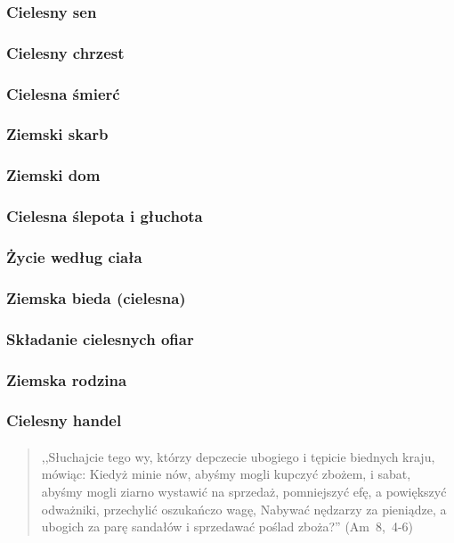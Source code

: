 \documentclass[10pt,a4paper,oneside]{article}
\begin{document}
\subsubsection{Cielesny sen}
\subsubsection{Cielesny chrzest}
\subsubsection{Cielesna śmierć}
\subsubsection{Ziemski skarb}
\subsubsection{Ziemski dom}
\subsubsection{Cielesna ślepota i głuchota}
\subsubsection{Życie według ciała}
\subsubsection{Ziemska bieda (cielesna)}
\subsubsection{Składanie cielesnych ofiar}
\subsubsection{Ziemska rodzina}
\subsubsection{Cielesny handel}
\paragraph{}
\begin{quote}
,,Słuchajcie tego wy, którzy depczecie ubogiego i tępicie biednych kraju, mówiąc: Kiedyż minie nów, abyśmy mogli kupczyć zbożem, i sabat, abyśmy mogli ziarno wystawić na sprzedaż, pomniejszyć efę, a powiększyć odważniki, przechylić oszukańczo wagę, Nabywać nędzarzy za pieniądze, a ubogich za parę sandałów i sprzedawać poślad zboża?'' \mbox{(Am 8, 4-6)}
\end{quote}
\end{document}
